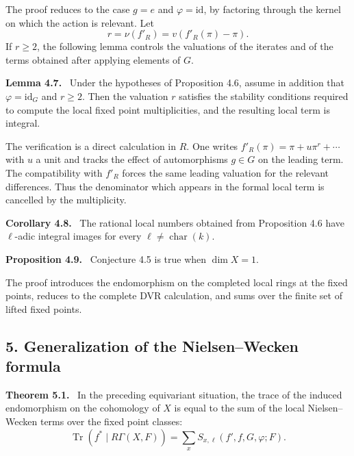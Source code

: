 \documentclass[14pt]{extarticle}
\newenvironment{statement}[1]{\par\medskip\noindent\textbf{#1.}\ }{\par\medskip}
\begin{document}
The proof reduces to the case $g=e$ and $\varphi=\mathrm{id}$, by factoring through the kernel on which the action is relevant. Let
\[
   r=\nu(f'_R)=v(f'_R(\pi)-\pi).
\]
If $r\ge2$, the following lemma controls the valuations of the iterates and of the terms obtained after applying elements of $G$.

\begin{statement}{Lemma 4.7}
Under the hypotheses of Proposition 4.6, assume in addition that $\varphi=\mathrm{id}_G$ and $r\ge2$. Then the valuation $r$ satisfies the stability conditions required to compute the local fixed point multiplicities, and the resulting local term is integral.
\end{statement}

The verification is a direct calculation in $R$. One writes $f'_R(\pi)=\pi+u\pi^r+\cdots$ with $u$ a unit and tracks the effect of automorphisms $g\in G$ on the leading term. The compatibility with $f'_R$ forces the same leading valuation for the relevant differences. Thus the denominator which appears in the formal local term is cancelled by the multiplicity.

\begin{statement}{Corollary 4.8}
The rational local numbers obtained from Proposition 4.6 have $\ell$-adic integral images for every $\ell\ne\operatorname{char}(k)$.
\end{statement}

\begin{statement}{Proposition 4.9}
Conjecture 4.5 is true when $\dim X=1$.
\end{statement}

The proof introduces the endomorphism on the completed local rings at the fixed points, reduces to the complete DVR calculation, and sums over the finite set of lifted fixed points.

\subsection*{5. Generalization of the Nielsen--Wecken formula}

\begin{statement}{Theorem 5.1}
In the preceding equivariant situation, the trace of the induced endomorphism on the cohomology of $X$ is equal to the sum of the local Nielsen--Wecken terms over the fixed point classes:
\[
   \operatorname{Tr}(f^*\mid R\Gamma(X,F))
      =\sum_x S_{x,\ell}(f',f,G,\varphi;F).
\]
\end{statement}
\end{document}
